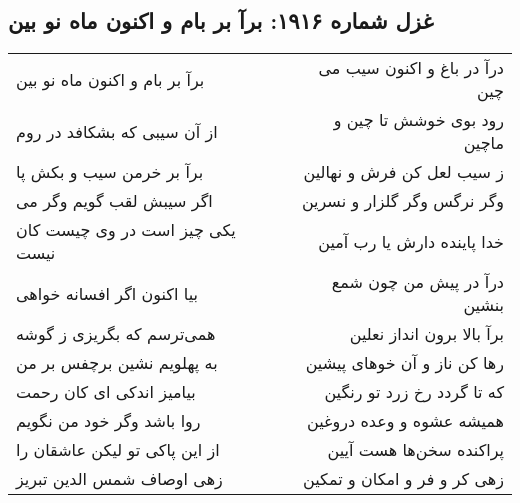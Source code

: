\begin{center}
\section*{غزل شماره ۱۹۱۶: برآ بر بام و اکنون ماه نو بین}
\label{sec:1916}
\begin{longtable}{l p{0.5cm} r}
برآ بر بام و اکنون ماه نو بین
&&
درآ در باغ و اکنون سیب می چین
\\
از آن سیبی که بشکافد در روم
&&
رود بوی خوشش تا چین و ماچین
\\
برآ بر خرمن سیب و بکش پا
&&
ز سیب لعل کن فرش و نهالین
\\
اگر سیبش لقب گویم وگر می
&&
وگر نرگس وگر گلزار و نسرین
\\
یکی چیز است در وی چیست کان نیست
&&
خدا پاینده دارش یا رب آمین
\\
بیا اکنون اگر افسانه خواهی
&&
درآ در پیش من چون شمع بنشین
\\
همی‌ترسم که بگریزی ز گوشه
&&
برآ بالا برون انداز نعلین
\\
به پهلویم نشین برچفس بر من
&&
رها کن ناز و آن خوهای پیشین
\\
بیامیز اندکی ای کان رحمت
&&
که تا گردد رخ زرد تو رنگین
\\
روا باشد وگر خود من نگویم
&&
همیشه عشوه و وعده دروغین
\\
از این پاکی تو لیکن عاشقان را
&&
پراکنده سخن‌ها هست آیین
\\
زهی اوصاف شمس الدین تبریز
&&
زهی کر و فر و امکان و تمکین
\\
\end{longtable}
\end{center}
